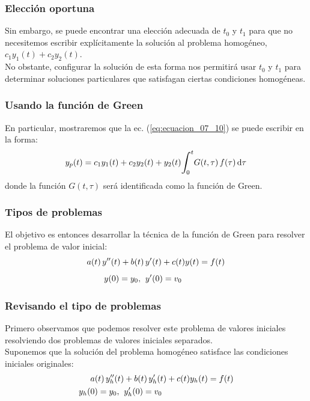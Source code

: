 \documentclass[12pt]{beamer}
\begin{document}
\begin{frame}
\frametitle{Elección oportuna}
Sin embargo, se puede encontrar una elección adecuada de $t_{0}$ y $t_{1}$ para que no necesitemos escribir explícitamente la solución al problema homogéneo, $c_{1} y_{1} (t) + c_{2} y_{2} (t)$. 
\\
\bigskip
\pause
No obstante, configurar la solución de esta forma nos permitirá usar $t_{0}$ y $t_{1}$ para determinar soluciones particulares que satisfagan ciertas condiciones homogéneas.
\end{frame}

\begin{frame}
\frametitle{Usando la función de Green}
En particular, mostraremos que la ec. (\ref{eq:ecuacion_07_10}) se puede escribir en la forma:
\pause
\begin{align}
y_{p} (t) = c_{1} y_{1} (t) + c_{2} y_{2} (t) +  y_{2} (t) \scaleint{6ex}_{\bs 0}^{t} G (t,\tau) \, f (\tau) \dd{\tau}
\label{eq:ecuacion_07_11}
\end{align}
donde la función $G (t, \tau)$ será identificada como la función de Green.
\end{frame}

\begin{frame}
\frametitle{Tipos de problemas}
El objetivo es entonces desarrollar la técnica de la función de Green para resolver el problema de valor inicial:
\pause
\begin{eqnarray}
\begin{aligned}
a (t) \, {y}^{\prime \prime} (t) + b (t) \, &{y}^{\prime} (t) + c (t) y(t) = f (t) \\[0.5em]
y (0) = y_{0}, \hspace{0.2cm} &{y}^{\prime} (0) = v_{0}
\end{aligned}
\label{eq:ecuacion_07_12}
\end{eqnarray}
\end{frame}

\begin{frame}
\frametitle{Revisando el tipo de problemas}
Primero observamos que podemos resolver este problema de valores iniciales resolviendo dos problemas de valores iniciales separados.
\\
\bigskip
\pause
Suponemos que la solución del problema homogéneo satisface las condiciones iniciales originales:
\pause
\begin{eqnarray}
\begin{aligned}
a (t) \, {y}^{\prime \prime}_{h} (t) &+ b (t) \, {y}^{\prime}_{h} (t) + c (t) y_{h} (t) = f (t) \\
y_{h} (0) = y_{0}, \hspace{0.2cm} &{y}^{\prime}_{h} (0) = v_{0}
\end{aligned}
\label{eq:ecuacion_07_13}
\end{eqnarray}

\end{frame}
\end{document}
